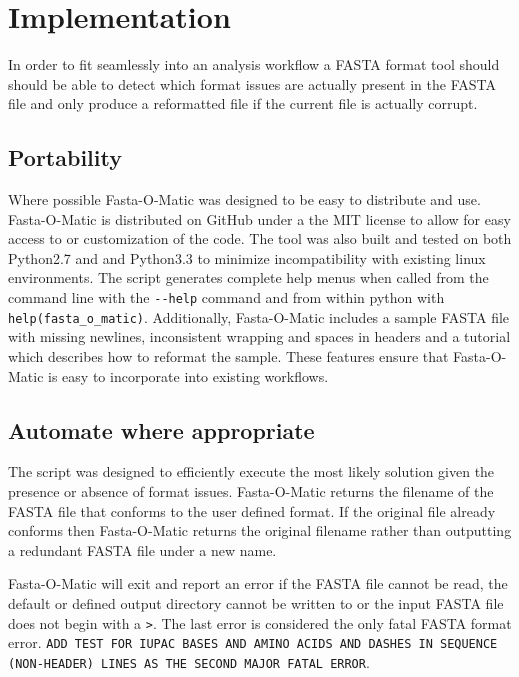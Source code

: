\section{Implementation}

In order to fit seamlessly into an analysis workflow a FASTA format tool should should be able to detect which format issues are actually present in the FASTA file and only produce a reformatted file if the current file is actually corrupt. 


\subsection{Portability}

Where possible Fasta-O-Matic was designed to be easy to distribute and use. Fasta-O-Matic is distributed on GitHub under a the MIT license to allow for easy access to or customization of the code. The tool was also built and tested on both Python2.7 and and Python3.3 to minimize incompatibility with existing linux environments. The script generates complete help menus when called from the command line with the \verb|--help| command and from within python with \verb|help(fasta_o_matic)|. Additionally, Fasta-O-Matic includes a sample FASTA file with missing newlines, inconsistent wrapping and spaces in headers and a tutorial which describes how to reformat the sample. These features ensure that Fasta-O-Matic is easy to incorporate into existing workflows.

\subsection{Automate where appropriate} 

The script was designed to efficiently execute the most likely solution given the presence or absence of format issues. Fasta-O-Matic returns the filename of the FASTA file that conforms to the user defined format. If the original file already conforms then Fasta-O-Matic returns the original filename rather than outputting a redundant FASTA file under a new name.

Fasta-O-Matic will exit and report an error if the FASTA file cannot be read, the default or defined output directory cannot be written to or the input FASTA file does not begin with a \verb|>|. The last error is considered the only fatal FASTA format error. \verb|ADD TEST FOR IUPAC BASES AND AMINO ACIDS AND DASHES IN SEQUENCE (NON-HEADER) LINES AS THE SECOND MAJOR FATAL ERROR|.

